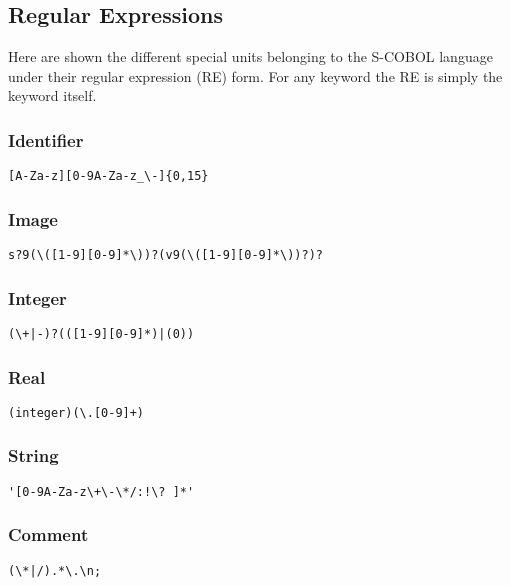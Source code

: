 \subsection{Regular Expressions}

Here are shown the different special units belonging to the S-COBOL language under their regular expression (RE) form. For any keyword the RE is simply the keyword itself.

\subsubsection{Identifier}

\begin{verbatim}
[A-Za-z][0-9A-Za-z_\-]{0,15}
\end{verbatim}


\subsubsection{Image}

\begin{verbatim}
s?9(\([1-9][0-9]*\))?(v9(\([1-9][0-9]*\))?)?
\end{verbatim}


\subsubsection{Integer}

\begin{verbatim}
(\+|-)?(([1-9][0-9]*)|(0))
\end{verbatim}


\subsubsection{Real}

\begin{verbatim}
(integer)(\.[0-9]+)
\end{verbatim}


\subsubsection{String}

\begin{verbatim}
'[0-9A-Za-z\+\-\*/:!\? ]*'
\end{verbatim}


\subsubsection{Comment}

\begin{verbatim}
(\*|/).*\.\n;
\end{verbatim}